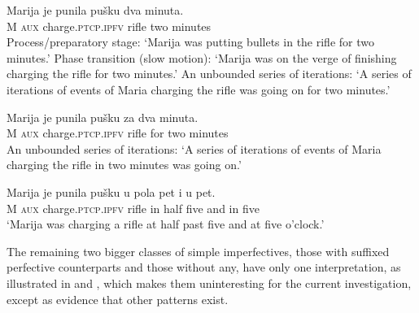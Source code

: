 \documentclass[output=paper]{langscibook}
\begin{document}
\ea\label{ars:ex:test-simple-a}
	\begin{xlist} 
		
	    \ex  \gll Marija je punila pušku dva minuta.\\ 
                  M \textsc{aux} charge\textsc{.ptcp.ipfv} rifle two minutes\\ 
            \ea Process\slash preparatory stage: `Marija was putting bullets in the rifle for two minutes.'
            \ex Phase transition (slow motion): `Marija was on the verge of finishing charging the rifle for two minutes.'
            \ex An unbounded series of iterations: `A series of iterations of events of Maria charging the rifle was going on for two minutes.'\label{ars:ex:test-simple-aa-iii}  
            \z\label{ars:ex:test-simple-aa}
            
           \ex  \gll Marija je punila pušku za dva minuta.\\ 
            M \textsc{aux} charge\textsc{.ptcp.ipfv} rifle for two minutes\\ 
            \glt An unbounded series of iterations: `A series of iterations of events of Maria charging the rifle in two minutes was going on.'
            \label{ars:ex:test-simple-ab}
            
        \ex  \gll Marija je punila pušku u pola pet i u pet.\\ 
                 M \textsc{aux} charge\textsc{.ptcp.ipfv} rifle in half five and in five\\ 
            \glt `Marija was charging a rifle at half past five and at five o'clock.' \label{ars:ex:test-simple-ac}

	\end{xlist}
\z

\noindent The remaining two bigger classes of simple imperfectives, those with suffixed perfective counterparts and those without any, have only one interpretation, as illustrated in  and , which makes them uninteresting for the current investigation, except as evidence that other patterns exist.\largerpage
\end{document}
